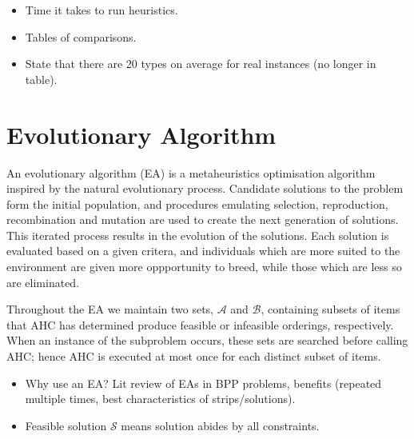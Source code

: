 \documentclass{elsarticle}
\begin{document}
{\color{Rhodamine}
\begin{itemize}[leftmargin=*]
	\item Time it takes to run heuristics.
	\item Tables of comparisons.
	\item State that there are 20 types on average for real instances (no longer in table).
\end{itemize}
}


\section{Evolutionary Algorithm}
\label{sec:ea}
An evolutionary algorithm (EA) is a metaheuristics optimisation algorithm inspired by the natural evolutionary process. Candidate solutions to the problem form the initial population, and procedures emulating selection, reproduction, recombination and mutation are used to create the next generation of solutions. This iterated process results in the evolution of the solutions. Each solution is evaluated based on a given critera, and individuals which are more suited to the environment are given more oppportunity to breed, while those which are less so are eliminated.


Throughout the EA we maintain two sets, $\mathcal{A}$ and $\mathcal{B}$, containing subsets of items that AHC has determined produce feasible or infeasible orderings, respectively. When an instance of the subproblem occurs, these sets are searched before calling AHC; hence AHC is executed at most once for each distinct subset of items.

{\color{OrangeRed}
\begin{itemize}[leftmargin=*]
	\item Why use an EA? Lit review of EAs in BPP problems, benefits (repeated multiple times, best characteristics of strips/solutions).
	\item Feasible solution $\mathcal{S}$ means solution abides by all constraints.
\end{itemize}
}
\end{document}
